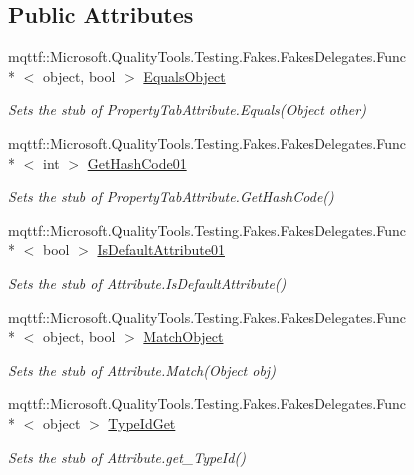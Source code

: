 \subsection*{Public Attributes}
\begin{DoxyCompactItemize}
\item 
mqttf\-::\-Microsoft.\-Quality\-Tools.\-Testing.\-Fakes.\-Fakes\-Delegates.\-Func\\*
$<$ object, bool $>$ \hyperlink{class_system_1_1_component_model_1_1_fakes_1_1_stub_property_tab_attribute_a54e5a0b81b31efa27b5686bde5119380}{Equals\-Object}
\begin{DoxyCompactList}\small\item\em Sets the stub of Property\-Tab\-Attribute.\-Equals(\-Object other)\end{DoxyCompactList}\item 
mqttf\-::\-Microsoft.\-Quality\-Tools.\-Testing.\-Fakes.\-Fakes\-Delegates.\-Func\\*
$<$ int $>$ \hyperlink{class_system_1_1_component_model_1_1_fakes_1_1_stub_property_tab_attribute_a323bfcb923242f9cefb21ae3108eddee}{Get\-Hash\-Code01}
\begin{DoxyCompactList}\small\item\em Sets the stub of Property\-Tab\-Attribute.\-Get\-Hash\-Code()\end{DoxyCompactList}\item 
mqttf\-::\-Microsoft.\-Quality\-Tools.\-Testing.\-Fakes.\-Fakes\-Delegates.\-Func\\*
$<$ bool $>$ \hyperlink{class_system_1_1_component_model_1_1_fakes_1_1_stub_property_tab_attribute_abb0762db3e1ab8a1b05623d89812f43b}{Is\-Default\-Attribute01}
\begin{DoxyCompactList}\small\item\em Sets the stub of Attribute.\-Is\-Default\-Attribute()\end{DoxyCompactList}\item 
mqttf\-::\-Microsoft.\-Quality\-Tools.\-Testing.\-Fakes.\-Fakes\-Delegates.\-Func\\*
$<$ object, bool $>$ \hyperlink{class_system_1_1_component_model_1_1_fakes_1_1_stub_property_tab_attribute_a543e1be935189ffbb330a8296af04cb9}{Match\-Object}
\begin{DoxyCompactList}\small\item\em Sets the stub of Attribute.\-Match(\-Object obj)\end{DoxyCompactList}\item 
mqttf\-::\-Microsoft.\-Quality\-Tools.\-Testing.\-Fakes.\-Fakes\-Delegates.\-Func\\*
$<$ object $>$ \hyperlink{class_system_1_1_component_model_1_1_fakes_1_1_stub_property_tab_attribute_a605a986262376bc414df8996f6a6cbc3}{Type\-Id\-Get}
\begin{DoxyCompactList}\small\item\em Sets the stub of Attribute.\-get\-\_\-\-Type\-Id()\end{DoxyCompactList}\end{DoxyCompactItemize}
